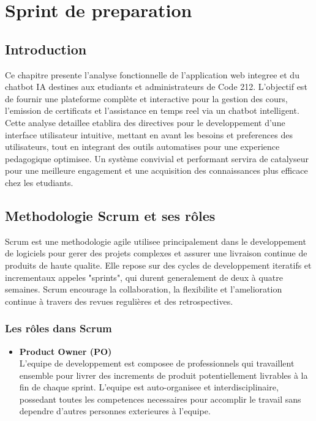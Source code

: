\chapter{Sprint de preparation}

\section{Introduction}
Ce chapitre presente l'analyse fonctionnelle de l'application web integree et du chatbot IA destines aux etudiants et administrateurs de Code 212. L'objectif est de fournir une plateforme complète et interactive pour la gestion des cours, l'emission de certificats et l'assistance en temps reel via un chatbot intelligent. Cette analyse detaillee etablira des directives pour le developpement d'une interface utilisateur intuitive, mettant en avant les besoins et preferences des utilisateurs, tout en integrant des outils automatises pour une experience pedagogique optimisee. Un système convivial et performant servira de catalyseur pour une meilleure engagement et une acquisition des connaissances plus efficace chez les etudiants.

\section{Methodologie Scrum et ses rôles}

Scrum est une methodologie agile utilisee principalement dans le developpement de logiciels pour gerer des projets complexes et assurer une livraison continue de produits de haute qualite. Elle repose sur des cycles de developpement iteratifs et incrementaux appeles "sprints", qui durent generalement de deux à quatre semaines. Scrum encourage la collaboration, la flexibilite et l'amelioration continue à travers des revues regulières et des retrospectives.

\subsection{Les rôles dans Scrum}

\begin{itemize}
    \item \textbf{Product Owner (PO)} \\
    L'equipe de developpement est composee de professionnels qui travaillent ensemble pour livrer des increments de produit potentiellement livrables à la fin de chaque sprint. L'equipe est auto-organisee et interdisciplinaire, possedant toutes les competences necessaires pour accomplir le travail sans dependre d'autres personnes exterieures à l'equipe.
\end{itemize}

